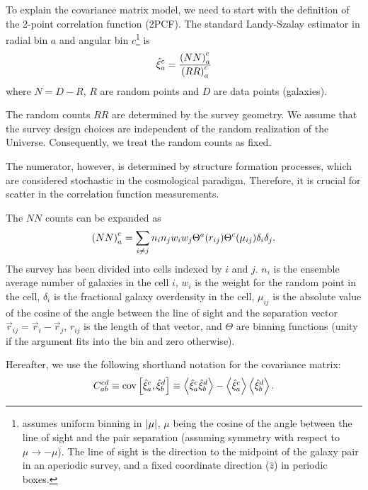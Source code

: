 To explain the covariance matrix model, we need to start with the definition of the 2-point correlation function (2PCF).
The standard Landy-Szalay estimator \citep{Landy-Szalay} in radial bin $a$ and angular bin $c$\footnote{\rascalc{} assumes uniform binning in $\abs{\mu}$, $\mu$ being the cosine of the angle between the line of sight and the pair separation (assuming symmetry with respect to $\mu \rightarrow -\mu$). The line of sight is the direction to the midpoint of the galaxy pair in an aperiodic survey, and a fixed coordinate direction ($\hat z$) in periodic boxes.} is
\begin{equation} \label{eq:Landy-Szalay-binned}
\hat\xi_a^c = \frac{\qty(NN)_a^c}{\qty(RR)_a^c}
\end{equation}
where $N=D-R$, $R$ are random points and $D$ are data points (galaxies).

The random counts $RR$ are determined by the survey geometry.
We assume that the survey design choices are independent of the random realization of the Universe.
Consequently, we treat the random counts as fixed.

The numerator, however, is determined by structure formation processes, which are considered stochastic in the cosmological paradigm.
Therefore, it is crucial for scatter in the correlation function measurements.

The $NN$ counts can be expanded as
\begin{equation} \label{eq:NN-RR-discrete}
\qty(NN)_a^c = \sum_{i\neq j}n_i n_j w_i w_j \Theta^a(r_{ij}) \Theta^c(\mu_{ij}) \delta_i \delta_j.
\end{equation}
The survey has been divided into cells indexed by $i$ and $j$.
$n_i$ is the ensemble average number of galaxies in the cell $i$, $w_i$ is the weight for the random point in the cell, $\delta_i$ is the fractional galaxy overdensity in the cell, $\mu_{ij}$ is the absolute value of the cosine of the angle between the line of sight and the separation vector $\vec r_{ij} = \vec r_i - \vec r_j$, $r_{ij}$ is the length of that vector, and $\Theta$ are binning functions (unity if the argument fits into the bin and zero otherwise).

Hereafter, we use the following shorthand notation for the covariance matrix:
\begin{equation} \label{eq:cov2x2_def}
C_{ab}^{cd} \equiv \cov \qty[\hat\xi_a^c, \hat\xi_b^d] \equiv \ev{\hat\xi_a^c \hat\xi_b^d} - \ev{\hat\xi_a^c} \ev{\hat\xi_b^d}.
\end{equation}

